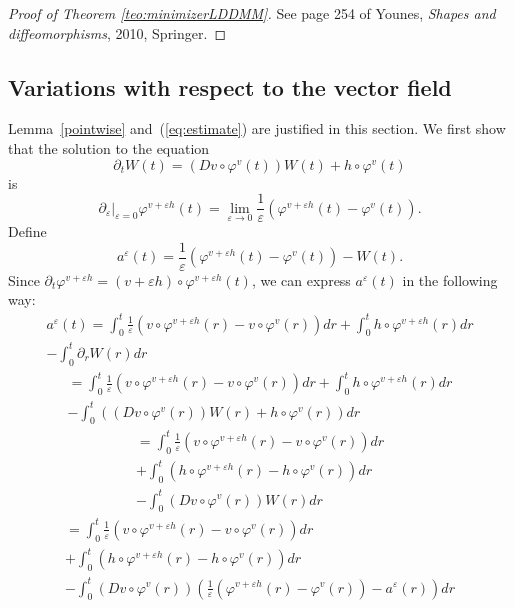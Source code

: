 \documentclass[a5paper,10pt,twoside]{article}
\theoremstyle{plain}
\theoremstyle{definition}
\theoremstyle{remark}
\begin{document}
\begin{proof}[Proof of Theorem \ref{teo:minimizerLDDMM}]
See page 254 of Younes, \textit{Shapes and diffeomorphisms}, 2010, Springer.
\end{proof}


\subsection{Variations with respect to the vector field}
Lemma~\ref{pointwise} and~(\ref{eq:estimate}) are justified in this section. We first show that the solution to the equation
\[
\partial_t W(t)=\left(Dv\circ \varphi^v(t)\right)W(t)+h\circ \varphi^v(t)
\]
is
\[
\left.\partial_\varepsilon\right|_{\varepsilon=0}\varphi^{v+\varepsilon h}(t)=\lim_{\varepsilon\to 0}\frac{1}{\varepsilon}\left(\varphi^{v+\varepsilon h}(t)-\varphi^v(t)\right).
\]
Define
\[
a^\varepsilon(t)=\frac{1}{\varepsilon}\left(\varphi^{v+\varepsilon h}(t)-\varphi^v(t)\right)-W(t).
\]
Since $\partial_t\varphi^{v+\varepsilon h}=(v+\varepsilon h)\circ\varphi^{v+\varepsilon h}(t)$, we can express $a^\varepsilon(t)$ in the following way:
%
\begin{multline*}
a^\varepsilon(t)=\int_0^t \frac{1}{\varepsilon}\left(v\circ\varphi^{v+\varepsilon h}(r)-v\circ\varphi^v(r)\right)dr+\int_0^t h\circ \varphi^{v+\varepsilon h}(r)dr \\-\int_0^t\partial_rW(r)dr
\end{multline*}
\begin{multline*}
=\int_0^t \frac{1}{\varepsilon}\left(v\circ\varphi^{v+\varepsilon h}(r)-v\circ\varphi^v(r)\right)dr+\int_0^t h\circ \varphi^{v+\varepsilon h}(r)dr \\-\int_0^t\left(\left(Dv\circ \varphi^v(r)\right)W(r)+h\circ \varphi^v(r)\right)dr
\end{multline*}
\begin{multline*}
=\int_0^t \frac{1}{\varepsilon}\left(v\circ\varphi^{v+\varepsilon h}(r)-v\circ\varphi^v(r)\right)dr\\+\int_0^t \left(h\circ \varphi^{v+\varepsilon h}(r)-h\circ \varphi^v(r)\right)dr \\-\int_0^t\left(Dv\circ \varphi^v(r)\right)W(r)dr
\end{multline*}
\begin{multline*}
=\int_0^t \frac{1}{\varepsilon}\left(v\circ\varphi^{v+\varepsilon h}(r)-v\circ\varphi^v(r)\right)dr\\+\int_0^t \left(h\circ \varphi^{v+\varepsilon h}(r)-h\circ \varphi^v(r)\right)dr \\-\int_0^t\left(Dv\circ \varphi^v(r)\right)\left(\frac{1}{\varepsilon}\left(\varphi^{v+\varepsilon h}(r)-\varphi^v(r)\right)-a^\varepsilon(r)\right)dr
\end{multline*}
\end{document}
